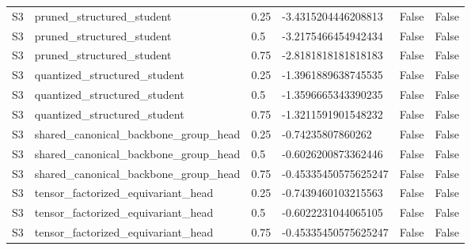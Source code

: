 \begin{table}[t]
\begin{tabular}{llllll}
S3 & pruned\_structured\_student & 0.25 & -3.4315204446208813 & False & False \\
S3 & pruned\_structured\_student & 0.5 & -3.2175466454942434 & False & False \\
S3 & pruned\_structured\_student & 0.75 & -2.8181818181818183 & False & False \\
S3 & quantized\_structured\_student & 0.25 & -1.3961889638745535 & False & False \\
S3 & quantized\_structured\_student & 0.5 & -1.3596665343390235 & False & False \\
S3 & quantized\_structured\_student & 0.75 & -1.3211591901548232 & False & False \\
S3 & shared\_canonical\_backbone\_group\_head & 0.25 & -0.74235807860262 & False & False \\
S3 & shared\_canonical\_backbone\_group\_head & 0.5 & -0.6026200873362446 & False & False \\
S3 & shared\_canonical\_backbone\_group\_head & 0.75 & -0.45335450575625247 & False & False \\
S3 & tensor\_factorized\_equivariant\_head & 0.25 & -0.7439460103215563 & False & False \\
S3 & tensor\_factorized\_equivariant\_head & 0.5 & -0.6022231044065105 & False & False \\
S3 & tensor\_factorized\_equivariant\_head & 0.75 & -0.45335450575625247 & False & False \\
\bottomrule
\end{tabular}
\end{table}
